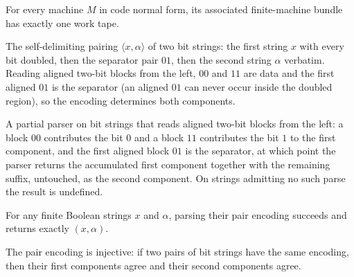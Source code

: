 \begin{lemma}
\label{Turing.CodeTM.toFinTM_k}
\leanok
{}
For every machine $M$ in code normal form, its associated finite-machine bundle has
exactly one work tape.
\end{lemma}

\begin{definition}
\label{Turing.pairEncode}
\leanok
The self-delimiting pairing $\langle x, \alpha\rangle$ of two bit strings:
the first string $x$ with every bit doubled, then the separator pair $01$,
then the second string $\alpha$ verbatim.  Reading aligned two-bit blocks
from the left, $00$ and $11$ are data and the first aligned $01$ is the
separator (an aligned $01$ can never occur inside the doubled region), so the
encoding determines both components.
\end{definition}

\begin{definition}
\label{Turing.pairDecode}
\leanok
A partial parser on bit strings that reads aligned two-bit blocks from the
left: a block $00$ contributes the bit $0$ and a block $11$ contributes the
bit $1$ to the first component, and the first aligned block $01$ is the
separator, at which point the parser returns the accumulated first component
together with the remaining suffix, untouched, as the second component.  On
strings admitting no such parse the result is undefined.
\end{definition}

\begin{lemma}
\label{Turing.pairDecode_pairEncode}
\leanok
{}
For any finite Boolean strings $x$ and $\alpha$, parsing their pair encoding succeeds
and returns exactly $(x,\alpha)$.
\end{lemma}

\begin{theorem}
\label{Turing.pairEncode_injective}
\leanok
{}
The pair encoding is injective: if two pairs of bit strings have the same encoding, then
their first components agree and their second components agree.
\end{theorem}

